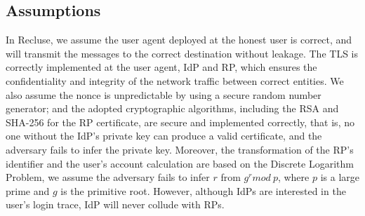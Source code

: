 \subsection{Assumptions}
In Recluse, we assume the user agent deployed at the honest user is correct, 
and will transmit the messages to the correct destination without leakage. 
The TLS is correctly implemented at the user agent, IdP and RP, which ensures the confidentiality and integrity of the network traffic between correct entities. 
We also assume the nonce is unpredictable by using  a secure random number generator; 
and the adopted cryptographic algorithms, including the RSA and SHA-256 for the RP certificate, are secure and implemented correctly, that is, no one without the IdP's private key can produce a valid certificate, 
and the adversary fails to infer the private key. 
Moreover, the transformation of the RP's identifier and the user's account calculation are based on the Discrete Logarithm Problem, 
we assume the adversary fails to infer $r$ from $g^r mod\ p$, where $p$ is a large prime and $g$ is the primitive root. 
However, although IdPs are interested in the user's login trace, IdP will never collude with RPs.







